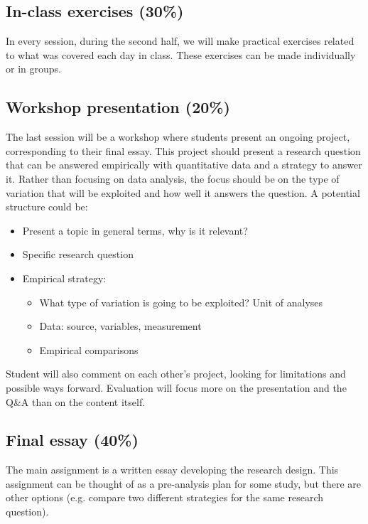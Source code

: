 \documentclass[12pt, a4paper]{article}
\begin{document}
\subsection*{In-class exercises (30\%)}

In every session, during the second half, we will make practical exercises related to what was covered each day in class. These exercises can be made individually or in groups.

\subsection*{Workshop presentation (20\%)}

The last session will be a workshop where students present an ongoing project, corresponding to their final essay. This project should present a research question that can be answered empirically with quantitative data and a strategy to answer it. Rather than focusing on data analysis, the focus should be on the type of variation that will be exploited and how well it answers the question. A potential structure could be:

\begin{itemize}
\setlength\itemsep{-5pt}
  \item Present a topic in general terms, why is it relevant?
  \item Specific research question
  \item Empirical strategy:
  \vspace{-10pt}
  \begin{itemize}
  \setlength\itemsep{-5pt}
    \item What type of variation is going to be exploited? Unit of analyses
    \item Data: source, variables, measurement
    \item Empirical comparisons
  \end{itemize}
\end{itemize}

Student will also comment on each other's project, looking for limitations and possible ways forward. Evaluation will focus more on the presentation and the Q\&A than on the content itself.

\subsection*{Final essay (40\%)}

The main assignment is a written essay developing the research design. This assignment can be thought of as a pre-analysis plan for some study, but there are other options (e.g. compare two different strategies for the same research question).
\end{document}
